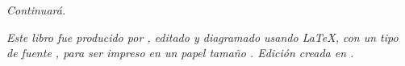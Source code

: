 \cleardoublepage

\null
\vfill

\begin{flushright}
{\normalsize \it Continuará.
\vspace*{4pt}}
\end{flushright}

\newpage

\null
\vfill
\thispagestyle{empty}


{\normalsize \it Este libro fue producido por \myauthor, editado y diagramado usando \LaTeX,
con un tipo de fuente \showfont, 
para ser impreso en un papel tamaño \imprimirpapersize. Edición creada en \imprimirdata.
\vspace*{4pt}}






